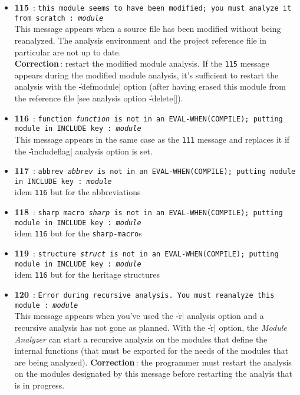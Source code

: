 \begin{itemize}
\item {\Large {\bf 115}}\ : {\tt this module seems to have been modified; you
must analyze it from scratch : {\em module}}\\
This message appears when a source file has been modified without being reanalyzed.  The analysis environment and the project reference file in particular are not up to date.\\
{\bf Correction}\,: restart the modified module analysis.
If the {\tt 115} message appears during the modified module analysis, it's sufficient to restart the analysis with the \|-defmodule| option (after having erased this module from the reference file [see analysis option \|-delete|]).

\item {\Large {\bf 116}}\ : {\tt function {\em function} is not in an
EVAL-WHEN(COMPILE); putting module in INCLUDE key : {\em module}}\\
This message appears in the same case as the {\tt 111} message and replaces it if the \|-includeflag| analysis option is set.  

\item {\Large {\bf 117}}\ : {\tt abbrev {\em abbrev} is not in an
EVAL-WHEN(COMPILE); putting module in INCLUDE key : {\em module}}\\
idem {\tt 116} but for the abbreviations

\item {\Large {\bf 118}}\ : {\tt sharp macro {\em sharp} is not in an
EVAL-WHEN(COMPILE); putting module in INCLUDE key : {\em module}}\\
idem {\tt 116} but for the {\tt sharp-macro}s

\item {\Large {\bf 119}}\ : {\tt structure {\em struct} is not in an
EVAL-WHEN(COMPILE); putting module in INCLUDE key : {\em module}}\\
idem {\tt 116} but for the heritage structures

\item {\Large {\bf 120}}\ : {\tt Error during recursive analysis. You must
reanalyze this module : {\em module}}\\
This message appears when you've used the \|-r| analysis option and a recursive analysis has not gone as planned.
With the \|-r| option, the {\em Module Analyzer} can start a recursive analysis on the modules that define the internal functions (that must be exported for the needs of the modules that are being analyzed).
{\bf Correction}\,: the programmer must restart the analysis on the modules designated by this message before restarting the analyis that is in progress.


\end{itemize}
